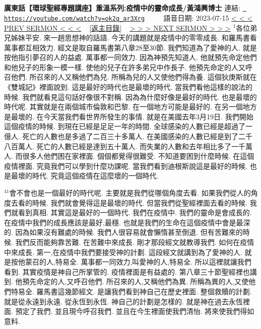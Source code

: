 \documentclass{book}
\begin{document}
\section{}
\label{sec:ok2q_ar3Xrg}
\textbf{廣東話【環球聖經專題講座】重溫系列:疫情中的靈命成長/黃鴻興博士}
\newline
\newline
連結: \href{https://youtube.com/watch?v=ok2q_ar3Xrg}{\texttt{ https://youtube.com/watch?v=ok2q\_ar3Xrg}} ~~~~ 語音日期: 2023-07-15 
\newline
\newline
\hyperref[sec:z2aRisPP3Ug]{\small{< < < PREV SERMON < < <}}
~
\hyperref[sec:index]{\small{[返主目錄]}}
~
\hyperref[sec:vk40QVvJNlA]{\small{> > > NEXT SERMON > > >}}
\newline
\newline
$^{1}$各位弟兄姊妹平安.
來一趟思想神的話語.
今天的講題就是疫情中的零零成長.
和羅馬書看萬事都互相效力.
經文是取自羅馬書第八章28至30節.
我們知道為了愛神的人.
就是按他指引夢召的人的益處.
萬事都一同效力.
因為神預先知道人.
他就預先命定他們和他兒子的形象一模一樣.
使他的兒子在許多弟兄中作長子.
他預先命定的人又呼召他們.
所召來的人又稱他們為兒.
所稱為兒的人又使他們得為養.
這個狄庚斯就在《雙城記》裡面說到.
這是最好的時代也是最壞的時代.
當我們看他這樣的說法的時候.
我們就看見這句話好像很不對稱.
因為為什麼好像是最好的時代.
也是最壞的時代呢.
其實就是在兩個城市倫敦和巴黎.
在一個地方可能是最好的.
在另一個地方是最壞的.
在今天當我們看世界所發生的事情.
就是在美國去年3月19日.
我們開始這個疫情的時候.
到現在已經是足足一年的時間.
全球感染的人數已經是超過了一億人.
死亡的人數也是多過了二百三十多萬人.
在美國感染的人數已經是到了二千八百萬人.
死亡的人數已經是達到五十萬人.
而失業的人數和去年相比多了一千萬人.
而很多人他們困在家裡面.
個個都覺得很難受.
不知道要困到什麼時候.
在這個疫情裡面.
究竟我們可以學到什麼功課呢.
當我們看到迪根斯說這是最好的時候.
也是最壞的時代.
究竟這個疫情在這麼壞的一個時代.

$^{41}$會不會也是一個最好的時代呢.
主要就是我們從哪個角度去看.
如果我們從人的角度去看的時候.
我們就會覺得這是最壞的時代.
但當我們從聖經裡面去看的時候.
我們就看到真相.
其實這是最好的一個時代.
我們在疫情中.
我們的靈命是會成長的.
在疫情中我們的成長應該是最好,最穩.
也就是我們的生命在這個疫情中會是最深的.
因為如果沒有難處的時候.
我們人很容易就會懶惰甚至倒退.
但有苦難來的時候.
我們反而能夠靠苦難.
在苦難中來成長.
剛才那段經文就教導我們.
如何在疫情中來成長.
第一,在疫情中我們要接受神的計劃.
這段經文就講到為了愛神的人.
就是按他蒙召的人,特易全.
萬事都一同效力,叫愛神的人,特易全.
所以這裡就讓我們看到.
其實疫情是神自己所掌管的.
疫情裡面是有益處的.
第八章三十節聖經裡也講到.
他預先命定的人,又呼召他們.
所召來的人,又稱他們為異.
所稱為異的人,又使他們特易全.
羅馬書這幾節經文.
是讓我們看到神自己在歷史裡面.
整個救贖的計劃.
就是從永遠到永遠.
從永恆到永恆.
神自己的計劃是怎樣的.
就是神在過去永恆裡面.
預定了我們.
並且現今呼召我們.
並且在今生裡面使我們清怡.
將來使我們得如意料.
\end{document}

